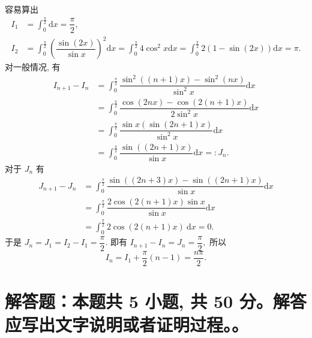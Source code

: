 \begin{solution}
容易算出
\begin{equation*}
\begin{aligned}
I_1 & = \int_0^{\frac{\pi}{2}} \mathrm{d}x = \dfrac{\pi}{2}, \\
I_2 & = \int_0^{\frac{\pi}{2}} \left(\dfrac{\sin (2x)}{\sin x}\right)^2 \mathrm{d}x = \int_0^{\frac{\pi}{2}} 4 \cos^2 x \mathrm{d}x = \int_0^{\frac{\pi}{2}} 2(1 - \sin(2x)) \mathrm{d}x = \pi.
\end{aligned}
\end{equation*}
对一般情况, 有
\begin{equation*}
\begin{aligned}
I_{n+1} - I_{n} & = \int_0^{\frac{\pi}{2}} \dfrac{\sin^2((n+1)x) - \sin^2(nx)}{\sin^2 x} \mathrm{d}x \\
& = \int_0^{\frac{\pi}{2}} \dfrac{\cos(2nx) - \cos(2(n+1)x)}{2\sin^2 x} \mathrm{d}x \\
& = \int_0^{\frac{\pi}{2}} \dfrac{\sin x (\sin(2n+1)x)}{\sin^2 x} \mathrm{d}x \\
& = \int_0^{\frac{\pi}{2}} \dfrac{\sin((2n+1)x)}{\sin x} \mathrm{d}x =: J_n.
\end{aligned}
\end{equation*}
对于 $J_n$ 有
\begin{equation*}
\begin{aligned}
J_{n+1} - J_n & = \int_0^{\frac{\pi}{2}} \dfrac{\sin((2n+3)x) - \sin((2n+1)x)}{\sin x} \mathrm{d}x \\
& = \int_0^{\frac{\pi}{2}} \dfrac{2 \cos(2(n+1)x) \sin x}{\sin x} \mathrm{d}x \\
& = \int_0^{\frac{\pi}{2}} 2 \cos(2(n+1)x) ~ \mathrm{d}x = 0.
\end{aligned}
\end{equation*}
于是 $\displaystyle J_n = J_1 = I_2 - I_1 = \dfrac{\pi}{2}.$ 即有 $I_{n+1} - I_n = J_n = \dfrac{\pi}{2},$ 所以
\begin{equation*}
I_n = I_1 + \dfrac{\pi}{2}(n - 1) = \dfrac{n\pi}{2}.
\end{equation*}
\end{solution}


\section{解答题：本题共 5 小题, 共 50 分。解答应写出文字说明或者证明过程。。}

